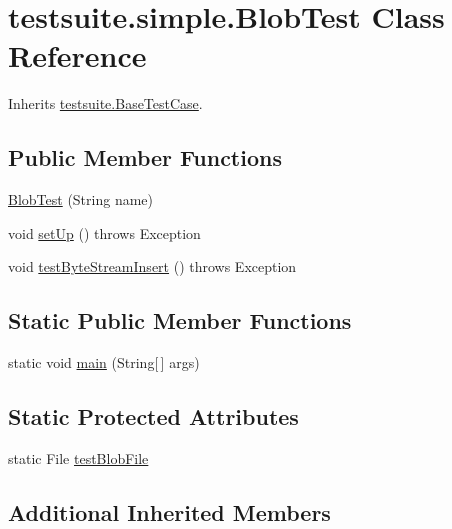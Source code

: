 \hypertarget{classtestsuite_1_1simple_1_1_blob_test}{}\section{testsuite.\+simple.\+Blob\+Test Class Reference}
\label{classtestsuite_1_1simple_1_1_blob_test}


Inherits \mbox{\hyperlink{classtestsuite_1_1_base_test_case}{testsuite.\+Base\+Test\+Case}}.

\subsection*{Public Member Functions}
\begin{DoxyCompactItemize}
\item 
\mbox{\hyperlink{classtestsuite_1_1simple_1_1_blob_test_a2741df6da9d07c3c6b8ba36abf15bc86}{Blob\+Test}} (String name)
\item 
void \mbox{\hyperlink{classtestsuite_1_1simple_1_1_blob_test_a81577d1e5c0481dee0a1b3f5638081df}{set\+Up}} ()  throws Exception 
\item 
void \mbox{\hyperlink{classtestsuite_1_1simple_1_1_blob_test_a2b70339f4974639665b17564cd918834}{test\+Byte\+Stream\+Insert}} ()  throws Exception 
\end{DoxyCompactItemize}
\subsection*{Static Public Member Functions}
\begin{DoxyCompactItemize}
\item 
static void \mbox{\hyperlink{classtestsuite_1_1simple_1_1_blob_test_afda9a3e28dbbf808702dcf118e046ec6}{main}} (String\mbox{[}$\,$\mbox{]} args)
\end{DoxyCompactItemize}
\subsection*{Static Protected Attributes}
\begin{DoxyCompactItemize}
\item 
static File \mbox{\hyperlink{classtestsuite_1_1simple_1_1_blob_test_ad34fd4e4b861e58833e6ca9697db35bb}{test\+Blob\+File}}
\end{DoxyCompactItemize}
\subsection*{Additional Inherited Members}


